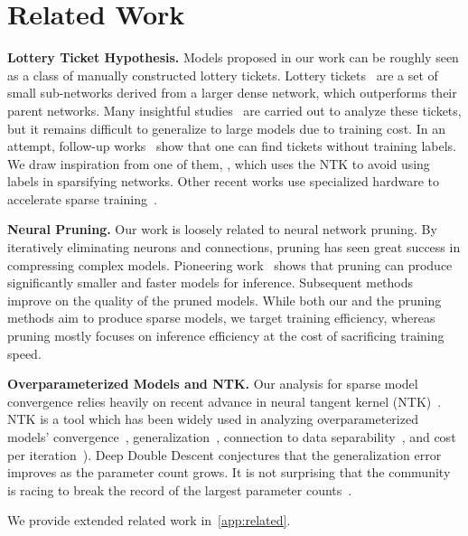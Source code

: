 \vspace{-0.2cm}
\section{Related Work}
\textbf{Lottery Ticket Hypothesis.} Models proposed in our work can be roughly seen as a class of manually constructed lottery tickets. Lottery tickets~\citep{frankle2018lottery} are a set of small sub-networks derived from a larger dense network, which outperforms their parent networks. Many insightful studies~\citep{morcos2019one, orseau2020logarithmic, frankle2019stabilizing, frankle2020linear, malach2020proving, pensia2020optimal} are carried out to analyze these tickets, but it remains difficult to generalize to large models due to training cost. In an attempt, follow-up works~\citep{wang2020picking, tanaka2020pruning} show that one can find tickets without training labels. 
We draw inspiration from one of them, \citet{liu2020finding}, which uses the NTK to avoid using labels in sparsifying networks. Other recent works use specialized hardware to accelerate sparse training~\citep{Goli_2020_CVPR, raihan2020sparse}.

\textbf{Neural Pruning.} Our work is loosely related to neural network pruning. By iteratively eliminating neurons and connections, pruning has seen great success in compressing complex models.
Pioneering work~\citep{han2015deep,han2015learning} shows that pruning can produce significantly smaller and faster models for inference.
Subsequent methods~\citep{li2016pruning, NIPS2017_a51fb975, dong2017learning,  sanh2020movement, lagunas2021block, zhu2017prune} improve on the quality of the pruned models. 
While both our and the pruning methods aim to produce sparse models, we target training efficiency, whereas pruning mostly focuses on inference efficiency at the cost of sacrificing training speed.



\textbf{Overparameterized Models and NTK.} Our analysis for sparse model convergence relies heavily on recent advance in neural tangent kernel (NTK)~\citep{jacot2018neural}. NTK is a tool which has been widely used in analyzing overparameterized models' convergence~\citep{ll18,dzps19,als19_dnn,als19_rnn,sy19}, generalization~\citep{all19}, connection to data separability~\citep{os20}, and cost per iteration~\citep{bpsw21}). Deep Double Descent \citep{nakkiran2019deep, d2020triple} conjectures that the generalization error improves as the parameter count grows. It is not surprising that the community is racing to break the record of the largest parameter counts~\citep{radford2019language, brown2020language, dosovitskiy2020image, tolstikhin2021mlp, zhang2021cpm, naumov2019deep, jumper2021highly}. 

We provide extended related work in~\cref{app:related}.


\vspace{-0.2cm}